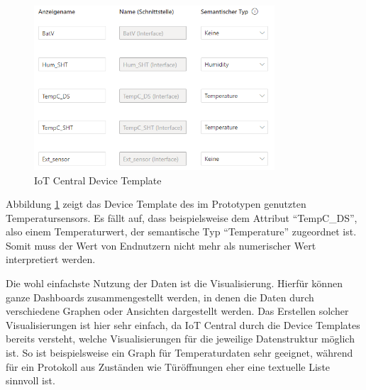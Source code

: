 \begin{figure}[H]
  \vspace{10pt}
  \begin{center}
    \includegraphics[width=0.8\textwidth]{./images/device-template.png}  
    \end{center}
  \vspace{-5pt}
  \caption[IoT Central Device Template]{IoT Central Device Template}
  \label{fig:device-template}
  \vspace{-10pt}
\end{figure}

Abbildung \ref{fig:device-template} zeigt das Device Template des im Prototypen genutzten Temperatursensors. Es fällt auf, dass beispielsweise dem Attribut ``TempC\_DS'', also einem Temperaturwert, der semantische Typ ``Temperature'' zugeordnet ist. Somit muss der Wert von Endnutzern nicht mehr als numerischer Wert interpretiert werden.

Die wohl einfachste Nutzung der Daten ist die Visualisierung. Hierfür können ganze Dashboards zusammengestellt werden, in denen die Daten durch verschiedene Graphen oder Ansichten dargestellt werden. Das Erstellen solcher Visualisierungen ist hier sehr einfach, da IoT Central durch die Device Templates bereits versteht, welche Visualisierungen für die jeweilige Datenstruktur möglich ist. So ist beispielsweise ein Graph für Temperaturdaten sehr geeignet, während für ein Protokoll aus Zuständen wie Türöffnungen eher eine textuelle Liste sinnvoll ist. 

